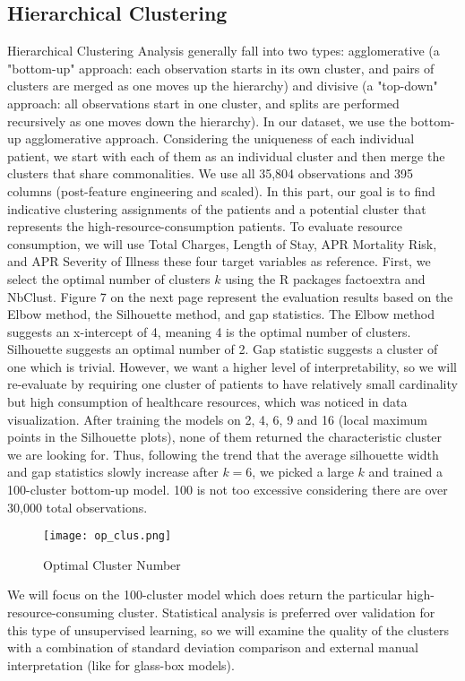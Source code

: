 \documentclass{article}
\begin{document}
\subsection{Hierarchical Clustering}
Hierarchical Clustering Analysis generally fall into two types: agglomerative (a "bottom-up" approach: each observation starts in its own cluster, and pairs of clusters are merged as one moves up the hierarchy) and divisive (a "top-down" approach: all observations start in one cluster, and splits are performed recursively as one moves down the hierarchy). In our dataset, we use the bottom-up agglomerative approach. Considering the uniqueness of each individual patient, we start with each of them as an individual cluster and then merge the clusters that share commonalities. We use all 35,804 observations and 395 columns (post-feature engineering and scaled). In this part, our goal is to find indicative clustering assignments of the patients and a potential cluster that represents the high-resource-consumption patients. To evaluate resource consumption, we will use Total Charges, Length of Stay, APR Mortality Risk, and APR Severity of Illness these four target variables as reference. 
\newline
\newline
First, we select the optimal number of clusters $k$ using the R packages factoextra and NbClust. Figure 7 on the next page represent the evaluation results based on the Elbow method, the Silhouette method, and gap statistics. The Elbow method suggests an x-intercept of 4, meaning 4 is the optimal number of clusters. Silhouette suggests an optimal number of 2. Gap statistic suggests a cluster of one which is trivial. However, we want a higher level of interpretability, so we will re-evaluate by requiring one cluster of patients to have relatively small cardinality but high consumption of healthcare resources, which was noticed in data visualization. After training the models on 2, 4, 6, 9 and 16 (local maximum points in the Silhouette plots), none of them returned the characteristic cluster we are looking for. Thus, following the trend that the average silhouette width and gap statistics slowly increase after $k = 6$, we picked a large $k$ and trained a 100-cluster bottom-up model. 100 is not too excessive considering there are over 30,000 total observations.
\begin{figure}[h]
    \centering
    \texttt{[image: op\_clus.png]}
    \caption{Optimal Cluster Number}
\end{figure}
\noindent
We will focus on the 100-cluster model which does return the particular high-resource-consuming cluster. Statistical analysis is preferred over validation for this type of unsupervised learning, so we will examine the quality of the clusters with a combination of standard deviation comparison and external manual interpretation (like for glass-box models).
\end{document}
